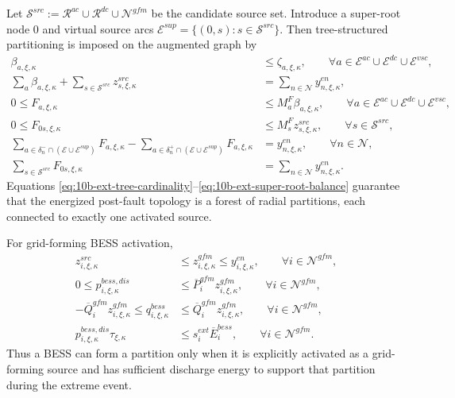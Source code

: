 Let \(\mathcal{S}^{src} := \mathcal{R}^{ac}\cup\mathcal{R}^{dc}\cup\mathcal{N}^{gfm}\) be the candidate source set. Introduce a super-root node \(0\) and virtual source arcs \(\mathcal{E}^{sup}=\{(0,s): s\in\mathcal{S}^{src}\}\). Then tree-structured partitioning is imposed on the augmented graph by
\begin{align}
\beta_{a,\xi,\kappa} &\le \zeta_{a,\xi,\kappa},
\qquad
\forall a\in\mathcal{E}^{ac}\cup\mathcal{E}^{dc}\cup\mathcal{E}^{vsc},
\label{eq:10b-ext-availability}\\
\sum_{a}\beta_{a,\xi,\kappa} + \sum_{s\in\mathcal{S}^{src}} z_{s,\xi,\kappa}^{src}
&= \sum_{n\in\mathcal{N}} y_{n,\xi,\kappa}^{en},
\label{eq:10b-ext-tree-cardinality}\\
0 \le F_{a,\xi,\kappa} &\le M_a^{F}\beta_{a,\xi,\kappa},
\qquad
\forall a\in\mathcal{E}^{ac}\cup\mathcal{E}^{dc}\cup\mathcal{E}^{vsc},
\label{eq:10b-ext-flow-capacity}\\
0 \le F_{0s,\xi,\kappa} &\le M_s^{F} z_{s,\xi,\kappa}^{src},
\qquad
\forall s\in\mathcal{S}^{src},
\label{eq:10b-ext-source-arc}\\
\sum_{a\in\delta_n^{-}\cap(\mathcal{E}\cup\mathcal{E}^{sup})} F_{a,\xi,\kappa}
- \sum_{a\in\delta_n^{+}\cap(\mathcal{E}\cup\mathcal{E}^{sup})} F_{a,\xi,\kappa}
&= y_{n,\xi,\kappa}^{en},
\qquad
\forall n\in\mathcal{N},
\label{eq:10b-ext-connectivity}\\
\sum_{s\in\mathcal{S}^{src}} F_{0s,\xi,\kappa}
&= \sum_{n\in\mathcal{N}} y_{n,\xi,\kappa}^{en}.
\label{eq:10b-ext-super-root-balance}
\end{align}
Equations \eqref{eq:10b-ext-tree-cardinality}--\eqref{eq:10b-ext-super-root-balance} guarantee that the energized post-fault topology is a forest of radial partitions, each connected to exactly one activated source.

For grid-forming BESS activation,
\begin{align}
z_{i,\xi,\kappa}^{src} &\le z_{i,\xi,\kappa}^{gfm} \le y_{i,\xi,\kappa}^{en},
\qquad \forall i\in\mathcal{N}^{gfm},
\label{eq:10b-ext-gfm-source-link}\\
0 \le p_{i,\xi,\kappa}^{bess,dis} &\le \overline P_i^{gfm} z_{i,\xi,\kappa}^{gfm},
\qquad \forall i\in\mathcal{N}^{gfm},
\label{eq:10b-ext-gfm-p}\\
-\overline Q_i^{gfm} z_{i,\xi,\kappa}^{gfm}
\le q_{i,\xi,\kappa}^{bess} &\le
\overline Q_i^{gfm} z_{i,\xi,\kappa}^{gfm},
\qquad \forall i\in\mathcal{N}^{gfm},
\label{eq:10b-ext-gfm-q}\\
p_{i,\xi,\kappa}^{bess,dis}\tau_{\xi,\kappa} &\le s_i^{ext}\overline E_i^{bess},
\qquad \forall i\in\mathcal{N}^{gfm}.
\label{eq:10b-ext-gfm-energy}
\end{align}
Thus a BESS can form a partition only when it is explicitly activated as a grid-forming source and has sufficient discharge energy to support that partition during the extreme event.

